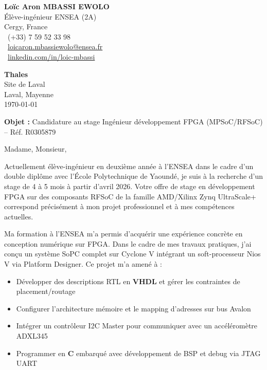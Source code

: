 \documentclass[11pt,a4paper]{letter}
\begin{document}
\begin{flushleft}
\textbf{Loïc Aron MBASSI EWOLO} \\
Élève-ingénieur ENSEA (2A) \\
Cergy, France \\
\faPhone\ (+33) 7 59 52 33 98 \\
\faEnvelope\ \href{mailto:loicaron.mbassiewolo@ensea.fr}{loicaron.mbassiewolo@ensea.fr} \\
\faLinkedin\ \href{https://www.linkedin.com/in/loic-mbassi}{linkedin.com/in/loic-mbassi}
\end{flushleft}

\vspace{0.5cm}

\begin{flushright}
\textbf{Thales} \\
Site de Laval \\
Laval, Mayenne \\
\today
\end{flushright}

\vspace{0.5cm}

\noindent\textbf{Objet :} Candidature au stage Ingénieur développement FPGA (MPSoC/RFSoC) -- Réf. R0305879

\vspace{0.5cm}

Madame, Monsieur,

\vspace{0.3cm}

Actuellement élève-ingénieur en deuxième année à l'ENSEA dans le cadre d'un double diplôme avec l'École Polytechnique de Yaoundé, je suis à la recherche d'un stage de 4 à 5 mois à partir d'avril 2026. Votre offre de stage en développement FPGA sur des composants RFSoC de la famille AMD/Xilinx Zynq UltraScale+ correspond précisément à mon projet professionnel et à mes compétences actuelles.

\vspace{0.3cm}

Ma formation à l'ENSEA m'a permis d'acquérir une expérience concrète en conception numérique sur FPGA. Dans le cadre de mes travaux pratiques, j'ai conçu un système SoPC complet sur Cyclone V intégrant un soft-processeur Nios V via Platform Designer. Ce projet m'a amené à :
\begin{itemize}
    \item Développer des descriptions RTL en \textbf{VHDL} et gérer les contraintes de placement/routage
    \item Configurer l'architecture mémoire et le mapping d'adresses sur bus Avalon
    \item Intégrer un contrôleur I2C Master pour communiquer avec un accéléromètre ADXL345
    \item Programmer en \textbf{C} embarqué avec développement de BSP et debug via JTAG UART
\end{itemize}
\end{document}
